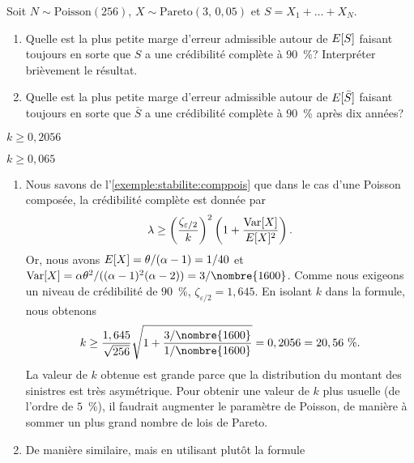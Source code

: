 \begin{exercice}
  Soit $N \sim \text{Poisson}(256)$, $X \sim \text{Pareto}(3,\, 0,05)$
  et $S = X_1 + \dots + X_N$.
  \begin{enumerate}
  \item Quelle est la plus petite marge d'erreur admissible autour de
    $E [ S ]$ faisant toujours en sorte que $S$ a une crédibilité
    complète à $90$~\%?  Interpréter brièvement le résultat.
  \item Quelle est la plus petite marge d'erreur admissible autour de
    $E [ \bar{S} ]$ faisant toujours en sorte que $\bar{S}$ a une
    crédibilité complète à $90$~\% après dix années?
  \end{enumerate}
  \begin{rep}
    \begin{inparaenum}
    \item $k \geq 0,2056$
    \item $k \geq 0,065$
    \end{inparaenum}
  \end{rep}
  \begin{sol}
    \begin{enumerate}
    \item Nous savons de l'\autoref{exemple:stabilite:comppois} que
      dans le cas d'une Poisson composée, la crédibilité complète est
      donnée par
      \begin{equation*}
        \lambda \geq
        \left(
          \frac{\zeta_{\varepsilon/2}}{k}
        \right)^2
        \left(
          1 + \frac{\operatorname{Var} [ X ]}{E [ X ]^2}
        \right).
      \end{equation*}
      Or, nous avons $E [ X ] = \theta/(\alpha - 1) = 1/40$ et
      $\var{X} = \alpha \theta^2/((\alpha - 1)^2(\alpha - 2)) =
      3/\nombre{1600}$. Comme nous exigeons un niveau de crédibilité
      de $90$~\%, $\zeta_{\varepsilon/2} = 1,645$. En isolant $k$ dans
      la formule, nous obtenons
      \begin{equation*}
        k \ge
        \frac{1,645}{\sqrt{256}}
        \sqrt{1 + \frac{3/\nombre{1600}}{1/\nombre{1600}}} =
        0,2056 = 20,56~\%.
      \end{equation*}
      La valeur de $k$ obtenue est grande parce que la
      distribution du montant des sinistres est très asymétrique. Pour
      obtenir une valeur de $k$ plus usuelle (de l'ordre de $5$~\%),
      il faudrait augmenter le paramètre de Poisson, de manière à
      sommer un plus grand nombre de lois de Pareto.
    \item De manière similaire, mais en utilisant plutôt la formule

\end{enumerate}
\end{sol}
\end{exercice}

